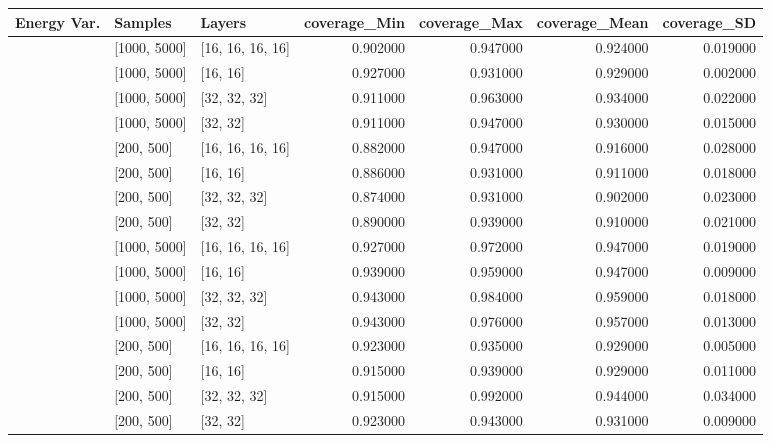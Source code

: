\begin{tabular}{lllrrrr}
\toprule
Energy Var. & Samples & Layers & coverage_Min & coverage_Max & coverage_Mean & coverage_SD \\
\midrule
[0.001, 0.0001] & [1000, 5000] & [16, 16, 16, 16] & 0.902000 & 0.947000 & 0.924000 & 0.019000 \\
[0.001, 0.0001] & [1000, 5000] & [16, 16] & 0.927000 & 0.931000 & 0.929000 & 0.002000 \\
[0.001, 0.0001] & [1000, 5000] & [32, 32, 32] & 0.911000 & 0.963000 & 0.934000 & 0.022000 \\
[0.001, 0.0001] & [1000, 5000] & [32, 32] & 0.911000 & 0.947000 & 0.930000 & 0.015000 \\
[0.001, 0.0001] & [200, 500] & [16, 16, 16, 16] & 0.882000 & 0.947000 & 0.916000 & 0.028000 \\
[0.001, 0.0001] & [200, 500] & [16, 16] & 0.886000 & 0.931000 & 0.911000 & 0.018000 \\
[0.001, 0.0001] & [200, 500] & [32, 32, 32] & 0.874000 & 0.931000 & 0.902000 & 0.023000 \\
[0.001, 0.0001] & [200, 500] & [32, 32] & 0.890000 & 0.939000 & 0.910000 & 0.021000 \\
[0.1, 0.01] & [1000, 5000] & [16, 16, 16, 16] & 0.927000 & 0.972000 & 0.947000 & 0.019000 \\
[0.1, 0.01] & [1000, 5000] & [16, 16] & 0.939000 & 0.959000 & 0.947000 & 0.009000 \\
[0.1, 0.01] & [1000, 5000] & [32, 32, 32] & 0.943000 & 0.984000 & 0.959000 & 0.018000 \\
[0.1, 0.01] & [1000, 5000] & [32, 32] & 0.943000 & 0.976000 & 0.957000 & 0.013000 \\
[0.1, 0.01] & [200, 500] & [16, 16, 16, 16] & 0.923000 & 0.935000 & 0.929000 & 0.005000 \\
[0.1, 0.01] & [200, 500] & [16, 16] & 0.915000 & 0.939000 & 0.929000 & 0.011000 \\
[0.1, 0.01] & [200, 500] & [32, 32, 32] & 0.915000 & 0.992000 & 0.944000 & 0.034000 \\
[0.1, 0.01] & [200, 500] & [32, 32] & 0.923000 & 0.943000 & 0.931000 & 0.009000 \\
\bottomrule
\end{tabular}
